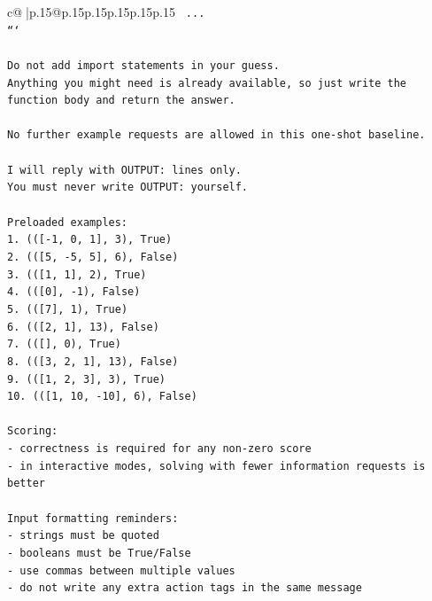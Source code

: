 \documentclass{article}
\begin{document}
{\begin{supertabular}{c@{$\;$}|p{.15\linewidth}@{}p{.15\linewidth}p{.15\linewidth}p{.15\linewidth}p{.15\linewidth}p{.15\linewidth}}
{{{\texttt{    ...} \\
\texttt{```} \\
\\ 
\texttt{Do not add import statements in your guess.} \\
\texttt{Anything you might need is already available, so just write the function body and return the answer.} \\
\\ 
\texttt{No further example requests are allowed in this one{-}shot baseline.} \\
\\ 
\texttt{I will reply with OUTPUT: lines only.} \\
\texttt{You must never write OUTPUT: yourself.} \\
\\ 
\texttt{Preloaded examples:} \\
\texttt{1. (({[}{-}1, 0, 1{]}, 3), True)} \\
\texttt{2. (({[}5, {-}5, 5{]}, 6), False)} \\
\texttt{3. (({[}1, 1{]}, 2), True)} \\
\texttt{4. (({[}0{]}, {-}1), False)} \\
\texttt{5. (({[}7{]}, 1), True)} \\
\texttt{6. (({[}2, 1{]}, 13), False)} \\
\texttt{7. (({[}{]}, 0), True)} \\
\texttt{8. (({[}3, 2, 1{]}, 13), False)} \\
\texttt{9. (({[}1, 2, 3{]}, 3), True)} \\
\texttt{10. (({[}1, 10, {-}10{]}, 6), False)} \\
\\ 
\texttt{Scoring:} \\
\texttt{{-} correctness is required for any non{-}zero score} \\
\texttt{{-} in interactive modes, solving with fewer information requests is better} \\
\\ 
\texttt{Input formatting reminders:} \\
\texttt{{-} strings must be quoted} \\
\texttt{{-} booleans must be True/False} \\
\texttt{{-} use commas between multiple values} \\
\texttt{{-} do not write any extra action tags in the same message} \\
\\ 
}}}
\end{supertabular}}
\end{document}
